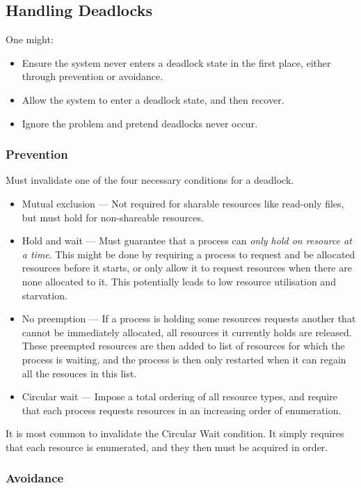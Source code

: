 \subsection{Handling Deadlocks}

One might:
\begin{itemize}
    \item Ensure the system never enters a deadlock state in the first place, either through prevention or avoidance.
    \item Allow the system to enter a deadlock state, and then recover.
    \item Ignore the problem and pretend deadlocks never occur.
\end{itemize}


\subsubsection{Prevention}

Must invalidate one of the four necessary conditions for a deadlock.
\begin{itemize}
    \item Mutual exclusion --- Not required for sharable resources like read-only files, but must hold for non-shareable resources.
    \item Hold and wait --- Must guarantee that a process can \textit{only hold on resource at a time}. This might be done by requiring a process to request and be allocated resources before it starts, or only allow it to request resources when there are none allocated to it. This potentially leads to low resource utilisation and starvation.
    \item No preemption --- If a process is holding some resources requests another that cannot be immediately allocated, all resources it currently holds are released. These preempted resources are then added to list of resources for which the process is waiting, and the process is then only restarted when it can regain all the resouces in this list.
    \item Circular wait --- Impose a total ordering of all resource types, and require that each process requests resources in an increasing order of enumeration.
\end{itemize}

It is most common to invalidate the Circular Wait condition. It simply requires that each resource is enumerated, and they then must be acquired in order.


\subsubsection{Avoidance}

